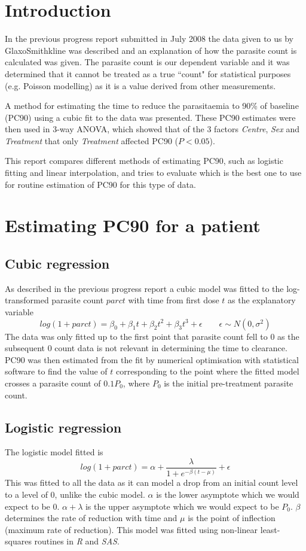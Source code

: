 \section{Introduction}
In the previous progress report submitted in July 2008 the data given to us by GlaxoSmithkline was described and an explanation of how the parasite count is calculated was given. The parasite count is our dependent variable and it was determined that it cannot be treated as a true ``count" for statistical purposes (e.g. Poisson modelling) as it is a value derived from other measurements.

A method for estimating the time to reduce the parasitaemia to 90\% of baseline (PC90) using a cubic fit to the data was presented. These PC90 estimates were then used in 3-way ANOVA, which showed that of the 3 factors \emph{Centre}, \emph{Sex} and \emph{Treatment} that only \emph{Treatment} affected PC90 ($P<0.05$).

This report compares different methods of estimating PC90, such as logistic fitting and linear interpolation, and tries to evaluate which is the best one to use for routine estimation of PC90 for this type of data.
\section{Estimating PC90 for a patient}
\subsection{Cubic regression}
As described in the previous progress report a cubic model was fitted to the log-transformed parasite count $parct$ with time from first dose $t$ as the explanatory variable
$$log(1+parct)=\beta_0+\beta_1t+\beta_2t^2+\beta_3t^3+\epsilon\quad\quad\epsilon\sim N(0,\sigma^2)$$
The data was only fitted up to the first point that parasite count fell to 0 as the subsequent 0 count data is not relevant in determining the time to clearance. PC90 was then estimated from the fit by numerical optimisation with statistical software to find the value of $t$ corresponding to the point where the fitted model crosses a parasite count of $0.1P_0$, where $P_0$ is the initial pre-treatment parasite count.
\subsection{Logistic regression}
The logistic model fitted is
$$log(1+parct)=\alpha+\frac{\lambda}{1+e^{-\beta(t-\mu)}}+\epsilon$$
This was fitted to all the data as it can model a drop from an initial count level to a level of 0, unlike the cubic model. $\alpha$ is the lower asymptote which we would expect to be 0. $\alpha+\lambda$ is the upper asymptote which we would expect to be $P_0$. $\beta$ determines the rate of reduction with time and $\mu$ is the point of inflection (maximum rate of reduction). This model was fitted using non-linear least-squares routines in \emph{R} and \emph{SAS}.
